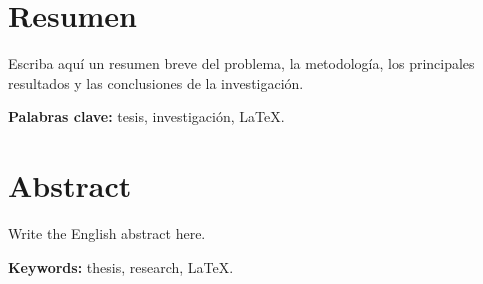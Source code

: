 \chapter*{Resumen}

Escriba aquí un resumen breve del problema, la metodología, los principales
resultados y las conclusiones de la investigación.

\noindent\textbf{Palabras clave:} tesis, investigación, LaTeX.

\chapter*{Abstract}

Write the English abstract here.

\noindent\textbf{Keywords:} thesis, research, LaTeX.
